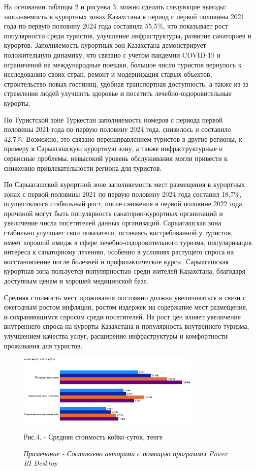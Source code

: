 \begin{multicols}{2}
На основании таблицы 2 и рисунка 3, можно сделать следующие выводы:
заполняемость в курортных зонах Казахстана в период с первой половины
2021 года по первую половину 2024 года составила 55,5\%, что показывает
рост популярности среди туристов, улучшение инфраструктуры, развитие
санаториев и курортов. Заполняемость курортных зон Казахстана
демонстрирует положительную динамику, что связано с учетом пандемии
COVID-19 и ограничений на международные поездки, большое число туристов
вернулось к исследованию своих стран, ремонт и модернизация старых
объектов, строительство новых гостиниц, удобная транспортная
доступность, а также из-за стремления людей улучшить здоровье и посетить
лечебно-оздоровительные курорты.

По Туристской зоне Туркестан заполняемость номеров с периода первой
половины 2021 года по первую половину 2024 года, снизилось и составило
42,7\%. Возможно, это связано перенаправлением туристов в другие
регионы, к примеру в Сарыагашскую курортную зону, а также
инфраструктурные и сервисные проблемы, невысокий уровень обслуживания
могли привести к снижению привлекательности региона для туристов.

По Сарыагашской курортной зоне заполняемость мест размещения в курортных
зонах с первой половины 2021 по первую половину 2024 года составил
18,7\%, осуществлялся стабильный рост, после снижения в первой половине
2022 года, причиной могут быть популярность санаторно-курортных
организаций и увеличение числа посетителей данных организаций.
Сарыагашская зона стабильно улучшает свои показатели, оставаясь
востребованной у туристов, имеет хороший имидж в сфере
лечебно-оздоровительного туризма, популяризация интереса к санаторному
лечению, особенно в условиях растущего спроса на восстановление после
болезней и профилактические курсы. Сарыагашская курортная зона
пользуется популярностью среди жителей Казахстана, благодаря доступным
ценам и хорошей медицинской базе.

Средняя стоимость мест проживания постоянно должна увеличиваться в связи
с ежегодным ростом инфляции, ростом издержек на содержание мест
размещения, и сохраняющимся спросом среди посетителей. На рост цен
влияет увеличение внутреннего спроса на курорты Казахстана и
популярность внутреннего туризма, улучшением качества услуг, расширение
инфраструктуры и комфортности проживания для туристов.
\end{multicols}

\begin{figure}[H]
	\centering
	\includegraphics[width=0.8\textwidth]{media/ekon/image6}
	\caption*{Рис.4. - Средняя стоимость койко-суток, тенге}
	\caption*{\emph{Примечание - Составлено авторами с помощью программы Power BI Desktop}}
\end{figure}

